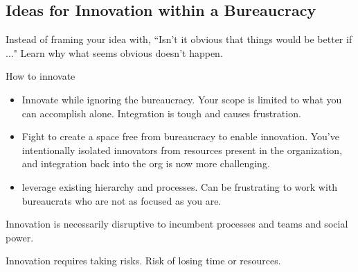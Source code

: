 \subsection{Ideas for Innovation within a Bureaucracy\label{sec:innovation}}

Instead of framing your idea with, ``Isn't it obvious that things would be better if ..." Learn why what seems obvious doesn't happen. 

How to innovate
\begin{itemize}
\item Innovate while ignoring the bureaucracy. Your scope is limited to what you can accomplish alone. Integration is tough and causes frustration.
\item Fight to create a space free from bureaucracy to enable innovation. You've intentionally isolated innovators from resources present in the organization, and integration back into the org is now more challenging. 
\item leverage existing hierarchy and processes. Can be frustrating to work with bureaucrats who are not as focused as you are.
\end{itemize}


Innovation is necessarily disruptive to incumbent processes and teams and social power. 

Innovation requires taking risks. Risk of losing time or resources. 


